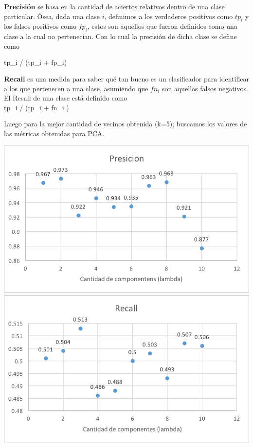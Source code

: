 \textbf{Precisión} se basa en la cantidad de aciertos relativos dentro de una clase particular. Ósea, dada una clase $i$, definimos a los verdaderos positivos como $tp_i$ y los falsos positivos como $fp_i$, estos son aquellos que fueron definidos como una clase a la cual no pertenecían.
Con lo cual la precisión de dicha clase se define como 

tp_i / (tp_i + fp_i)

\textbf{Recall} es una medida para saber qué tan bueno es un clasificador para identificar a los que pertenecen a una clase, asumiendo que $fn_i$ son aquellos falsos negativos.
El Recall de una clase está definido como \\
tp_i / (tp_i + fn_i )

Luego para la mejor cantidad de vecinos obtenida (k=5); buscamos los valores de las métricas obtenidas para PCA.

\includegraphics[scale=1]{imagenes/pcaPresicion.png}\\
\includegraphics[scale=1]{imagenes/pcaRecall.png}

